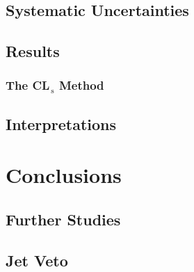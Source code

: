 \documentclass[10pt,twoside,cucitura,classica,english,openany]{toptesi}
\begin{document}


\section{Systematic Uncertainties}
\label{sec:syst-uncert}



\section{Results}
\label{sec:results}



\subsection{The CL$_\mathrm{\, s}$ Method}
\label{sec:cl_mathrm-s-method}



\section{Interpretations}
\label{sec:interpretations}



\chapter{Conclusions}
\label{cha:conclusions}



\begin{appendices}
  \chapter{Further Studies}

  \section{Jet Veto }
  \label{sec:jet-veto}

  
\end{appendices}

\printglossaries

 \printbibliography
\end{document}
